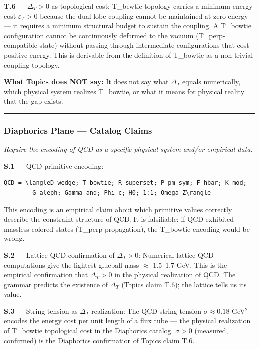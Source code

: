 \documentclass[11pt,a4paper]{article}
\begin{document}
\textbf{T.6} --- $\Delta_T > 0$ as topological cost: T\_bowtie topology carries a minimum energy cost $\varepsilon_T > 0$ because the dual-lobe coupling cannot be maintained at zero energy --- it requires a minimum structural budget to sustain the coupling. A T\_bowtie configuration cannot be continuously deformed to the vacuum (T\_perp-compatible state) without passing through intermediate configurations that cost positive energy. This is derivable from the definition of T\_bowtie as a non-trivial coupling topology.

\textbf{What Topics does NOT say:} It does not say what $\Delta_T$ equals numerically, which physical system realizes T\_bowtie, or what it means for physical reality that the gap exists.

\begin{center}
\rule{0.5\textwidth}{0.4pt}
\end{center}

\subsubsection{Diaphorics Plane --- Catalog Claims}

\emph{Require the encoding of QCD as a specific physical system and/or empirical data.}

\textbf{S.1} --- QCD primitive encoding:

\begin{lstlisting}
QCD = \langleD_wedge; T_bowtie; R_superset; P_pm_sym; F_hbar; K_mod;
        G_aleph; Gamma_and; Phi_c; H0; 1:1; Omega_Z\rangle
\end{lstlisting}

This encoding is an empirical claim about which primitive values correctly describe the constraint structure of QCD. It is falsifiable: if QCD exhibited massless colored states (T\_perp propagation), the T\_bowtie encoding would be wrong.

\textbf{S.2} --- Lattice QCD confirmation of $\Delta_T > 0$: Numerical lattice QCD computations give the lightest glueball mass $\approx$ 1.5--1.7 GeV. This is the empirical confirmation that $\Delta_T > 0$ in the physical realization of QCD. The grammar predicts the existence of $\Delta_T$ (Topics claim T.6); the lattice tells us its value.

\textbf{S.3} --- String tension as $\Delta_T$ realization: The QCD string tension $\sigma \approx 0.18$ GeV$^{2}$ encodes the energy cost per unit length of a flux tube --- the physical realization of T\_bowtie topological cost in the Diaphorics catalog. $\sigma > 0$ (measured, confirmed) is the Diaphorics confirmation of Topics claim T.6.
\end{document}
